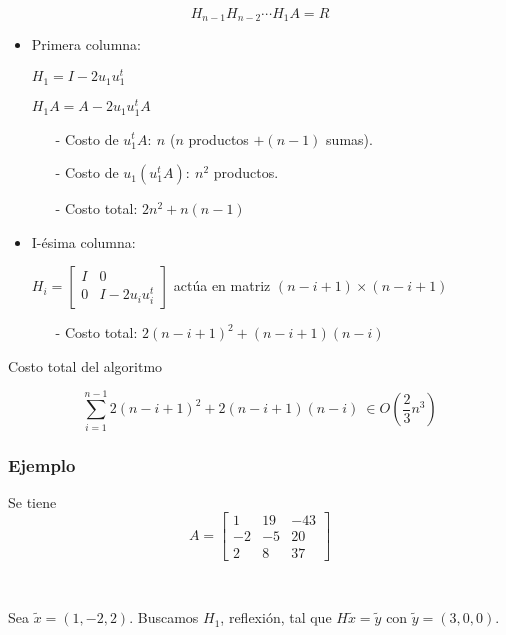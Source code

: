 \[H_{n-1}H_{n-2}\cdots H_{1}A = R\]

\begin{itemize}
    \item Primera columna:
    
    $H_1 = I - 2u_{1}u_{1}^{t}$

    $H_{1}A = A - 2u_{1}u_{1}^{t}A$

    \begin{itemize}
        \item[-] Costo de $u_{1}^{t}A:~n$ ($n$ productos $+ (n-1)$ sumas).
        \item[-] Costo de $u_1(u_{1}^{t}A):~n^2$ productos.
        \item[-] Costo total: $2n^2 + n(n-1)$
    \end{itemize}

    \item I-ésima columna:
    
    $H_{i} = \begin{bmatrix}
        I & 0 \\ 0 & I - 2u_{i}u_{i}^{t}
    \end{bmatrix}$ actúa en matriz $(n-i+1)\times(n-i+1)$

    \begin{itemize}
        \item[-] Costo total: $2{(n-i+1)}^{2} + (n-i+1)(n-i)$
    \end{itemize}
\end{itemize}

Costo total del algoritmo

\[\sum_{i=1}^{n-1} 2{(n-i+1)}^{2} + 2(n-i+1)(n-i) ~\in O(\frac{2}{3}n^{3})\]

\newpage

\subsubsection{Ejemplo}\label{subsubsec:householder_ejemplo}

Se tiene 
\[
A = 
\begin{bmatrix}
    1 & 19 & -43 \\
    -2 & -5 & 20 \\
    2 & 8 & 37
\end{bmatrix}
\]

\

\noindent Sea $\tilde{x} = (1,-2,2)$. Buscamos $H_1$, reflexión, tal que $H\tilde{x} = \tilde{y}$ con $\tilde{y} = (3,0,0)$.

\

